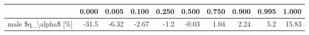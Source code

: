 \begin{tabular}{lrrrrrrrrr}
\toprule
{} &  0.000 &  0.005 &  0.100 &  0.250 &  0.500 &  0.750 &  0.900 &  0.995 &  1.000 \\
\midrule
male \$q\_\textbackslash alpha\$ [\%] &  -31.5 &  -6.32 &  -2.67 &   -1.2 &  -0.03 &   1.04 &   2.24 &    5.2 &  15.83 \\
\bottomrule
\end{tabular}
